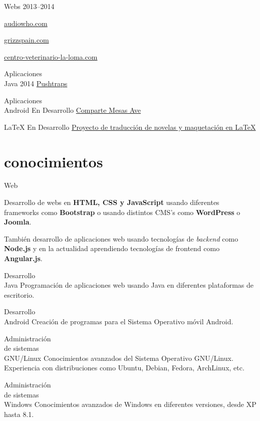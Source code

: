 \documentclass[hidelinks]{friggeri-cv} %
\begin{document}
\begin{entrylist}
\entry
{Webs}
{}
{2013--2014}
{
\href{http://www.audiowho.com}{audiowho.com}

\href{http://grizzspain.com/}{grizzspain.com}

\href{http://centro-veterinario-la-loma.com/}{centro-veterinario-la-loma.com}
}
\entry
{Aplicaciones \\ Java}
{}
{2014}
{
\href{http://bigomby.github.io/pushtraps/}{Pushtraps}
}

\entry
{Aplicaciones \\ Android}
{}
{En Desarrollo}
{
\href{http://bigomby.github.io/mesas-ave/}{Comparte Mesas Ave}
}

\entry
{\LaTeX}
{}
{En Desarrollo}
{
\href{https://github.com/Bigomby/audiowho-novelas}{Proyecto de traducción de novelas y
maquetación en \LaTeX} 
}

\end{entrylist}


\section{conocimientos}

\begin{entrylist}
\entry
{Web}
{}
{}
{Desarrollo de webs en \textbf{HTML, CSS y JavaScript} usando diferentes frameworks como
\textbf{Bootstrap} o usando distintos CMS's como \textbf{WordPress} o \textbf{Joomla}.

También desarrollo de aplicaciones web usando tecnologías de \emph{backend} como
\textbf{Node.js} y en la actualidad aprendiendo tecnologías de frontend como
\textbf{Angular.js}.
}

\entry
{Desarrollo \\ Java}
{}
{}
{Programación de aplicaciones web usando Java en diferentes plataformas de escritorio.}

\entry
{Desarrollo \\ Android}
{}
{}
{Creación de programas para el Sistema Operativo móvil Android.}

\entry
{Administración \\ de sistemas \\ GNU/Linux}
{}
{}
{Conocimientos avanzados del Sistema Operativo GNU/Linux. Experiencia con 
distribuciones como Ubuntu, Debian, Fedora, ArchLinux, etc.}

\entry
{Administración \\ de sistemas \\ Windows}
{}
{}
{Conocimientos avanzados de Windows en diferentes versiones, desde XP hasta 8.1.}
\end{entrylist}
\end{document}
